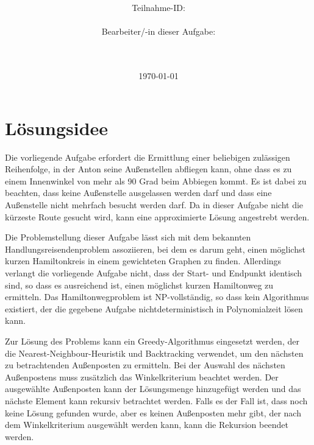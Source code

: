 \documentclass[a4paper,10pt,ngerman]{scrartcl}
\title{\textbf{\Huge\Aufgabe}}
\author{\LARGE Teilnahme-ID: \LARGE \TeilnahmeId \\\\
\LARGE Bearbeiter/-in dieser Aufgabe: \\
\LARGE \Name\\\\}
\date{\LARGE\today}
\begin{document}
    \maketitle
    \tableofcontents
    \vspace{0.5cm}
    \newpage


    \section{Lösungsidee}\label{sec:losungsidee}

    Die vorliegende Aufgabe erfordert die Ermittlung einer beliebigen zulässigen Reihenfolge,
    in der Anton seine Außenstellen abfliegen kann, ohne dass es zu einem Innenwinkel von mehr als 90 Grad beim Abbiegen kommt.
    Es ist dabei zu beachten, dass keine Außenstelle ausgelassen werden darf und dass eine Außenstelle nicht mehrfach besucht werden darf.
    Da in dieser Aufgabe nicht die kürzeste Route gesucht wird, kann eine approximierte Lösung angestrebt werden.

    Die Problemstellung dieser Aufgabe lässt sich mit dem bekannten Handlungsreisendenproblem assoziieren, bei dem es darum geht, einen möglichst kurzen Hamiltonkreis in einem gewichteten Graphen zu finden.
    Allerdings verlangt die vorliegende Aufgabe nicht, dass der Start- und Endpunkt identisch sind, so dass es ausreichend ist, einen möglichst kurzen Hamiltonweg zu ermitteln.
    Das Hamiltonwegproblem ist NP-vollständig, so dass kein Algorithmus existiert, der die gegebene Aufgabe nichtdeterministisch in Polynomialzeit lösen kann.

    Zur Lösung des Problems kann ein Greedy-Algorithmus eingesetzt werden, der die Nearest-Neighbour-Heuristik und Backtracking verwendet, um den nächsten zu betrachtenden Außenposten zu ermitteln.
    Bei der Auswahl des nächsten Außenpostens muss zusätzlich das Winkelkriterium beachtet werden.
    Der ausgewählte Außenposten kann der Lösungsmenge hinzugefügt werden und das nächste Element kann rekursiv betrachtet werden.
    Falls es der Fall ist, dass noch keine Lösung gefunden wurde, aber es keinen Außenposten mehr gibt, der nach dem Winkelkriterium ausgewählt werden kann, kann die Rekursion beendet werden.
\end{document}
